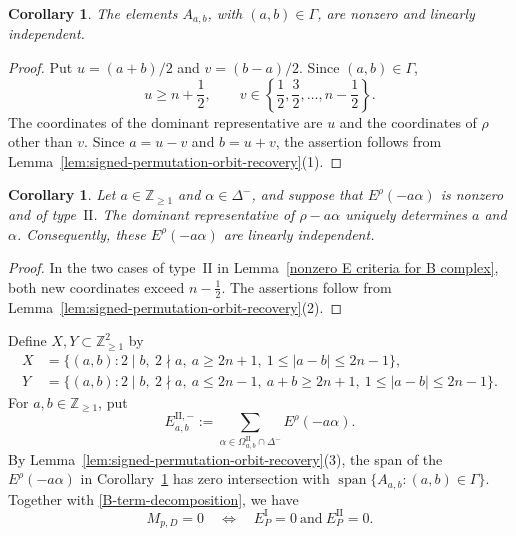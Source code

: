 \documentclass[11pt,a4paper]{amsart}
\newcommand{\ZZ}{\mathbb Z}
\theoremstyle{plain}
\newtheorem{cor}[theorem]{Corollary}
\numberwithin{equation}{section}
\newenvironment{pf}{\begin{proof}}{\end{proof}}
\begin{document}
\begin{cor}\label{independent type I B}
The elements \(A_{a,b}\), with \((a,b)\in\Gamma\), are nonzero
and linearly independent.
\end{cor}

\begin{pf}
Put \(u=(a+b)/2\) and \(v=(b-a)/2\). Since \((a,b)\in\Gamma\),
\[
u\ge n+\frac12,\qquad
v\in\left\{\frac12,\frac32,\ldots,n-\frac12\right\}.
\]
The coordinates of the dominant representative are \(u\) and the
coordinates of \(\rho\) other than \(v\). Since \(a=u-v\) and \(b=u+v\), the assertion
follows from Lemma~\ref{lem:signed-permutation-orbit-recovery}(1).
\end{pf}

\begin{cor}\label{independent type II B}
Let \(a\in\ZZ_{\ge1}\) and \(\alpha\in\Delta^-\), and suppose
that \(E^\rho(-a\alpha)\) is nonzero and of type~\(\mathrm{II}\).
The dominant representative of \(\rho-a\alpha\) uniquely
determines \(a\) and \(\alpha\).
Consequently, these \(E^\rho(-a\alpha)\) are linearly independent.
\end{cor}

\begin{pf}
In the two cases of type~\(\mathrm{II}\) in
Lemma~\ref{nonzero E criteria for B complex}, both new coordinates
exceed \(n-\tfrac12\). The assertions follow from
Lemma~\ref{lem:signed-permutation-orbit-recovery}(2).
\end{pf}

Define \(X,Y\subset\ZZ_{\ge1}^2\) by
\begin{align*}
X&=\{(a,b):2\mid b,\ 2\nmid a,\ a\ge2n+1,\
1\le|a-b|\le2n-1\},\\
Y&=\{(a,b):2\mid b,\ 2\nmid a,\ a\le2n-1,\
a+b\ge2n+1,\ 1\le|a-b|\le2n-1\}.
\end{align*}
For \(a,b\in\ZZ_{\ge1}\), put
\[
E_{a,b}^{\mathrm{II},-}
:=\sum_{\alpha\in\Omega_{a,b}^{\mathrm{II}}\cap\Delta^-}
E^\rho(-a\alpha).
\]
By Lemma~\ref{lem:signed-permutation-orbit-recovery}(3),
the span of the \(E^\rho(-a\alpha)\) in
Corollary~\ref{independent type II B} has zero intersection with
\(\operatorname{span}\{A_{a,b}:(a,b)\in\Gamma\}\).
Together with \eqref{B-term-decomposition}, we have
\begin{equation}\label{B-type-split-zero}
M_{p,D}=0
\quad\Longleftrightarrow\quad
E_P^{\mathrm I}=0
\ \text{and}\
E_P^{\mathrm{II}}=0.
\end{equation}
\end{document}
